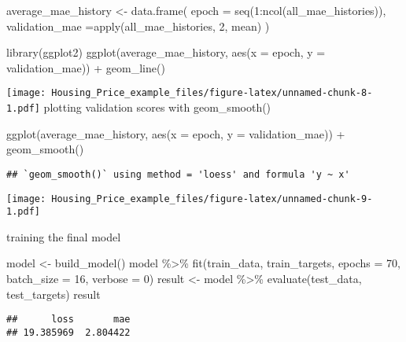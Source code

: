 \documentclass[
]{article}
\newenvironment{Shaded}{\begin{snugshade}}{\end{snugshade}}
\newcommand{\AttributeTok}[1]{\textcolor[rgb]{0.77,0.63,0.00}{#1}}
\newcommand{\DecValTok}[1]{\textcolor[rgb]{0.00,0.00,0.81}{#1}}
\newcommand{\FunctionTok}[1]{\textcolor[rgb]{0.00,0.00,0.00}{#1}}
\newcommand{\NormalTok}[1]{#1}
\newcommand{\OtherTok}[1]{\textcolor[rgb]{0.56,0.35,0.01}{#1}}
\newcommand{\SpecialCharTok}[1]{\textcolor[rgb]{0.00,0.00,0.00}{#1}}
\begin{document}
\begin{Shaded}
\begin{Highlighting}[]
\NormalTok{average\_mae\_history }\OtherTok{\textless{}{-}} \FunctionTok{data.frame}\NormalTok{(}
  \AttributeTok{epoch =} \FunctionTok{seq}\NormalTok{(}\DecValTok{1}\SpecialCharTok{:}\FunctionTok{ncol}\NormalTok{(all\_mae\_histories)), }
  \AttributeTok{validation\_mae =}\FunctionTok{apply}\NormalTok{(all\_mae\_histories, }\DecValTok{2}\NormalTok{, mean)}
\NormalTok{)}

\FunctionTok{library}\NormalTok{(ggplot2)}
\FunctionTok{ggplot}\NormalTok{(average\_mae\_history, }\FunctionTok{aes}\NormalTok{(}\AttributeTok{x =}\NormalTok{ epoch, }\AttributeTok{y =}\NormalTok{ validation\_mae)) }\SpecialCharTok{+} \FunctionTok{geom\_line}\NormalTok{()}
\end{Highlighting}
\end{Shaded}

\texttt{[image: Housing\_Price\_example\_files/figure-latex/unnamed-chunk-8-1.pdf]}
plotting validation scores with geom\_smooth()

\begin{Shaded}
\begin{Highlighting}[]
\FunctionTok{ggplot}\NormalTok{(average\_mae\_history, }\FunctionTok{aes}\NormalTok{(}\AttributeTok{x =}\NormalTok{ epoch, }\AttributeTok{y =}\NormalTok{ validation\_mae)) }\SpecialCharTok{+} \FunctionTok{geom\_smooth}\NormalTok{()}
\end{Highlighting}
\end{Shaded}

\begin{verbatim}
## `geom_smooth()` using method = 'loess' and formula 'y ~ x'
\end{verbatim}

\texttt{[image: Housing\_Price\_example\_files/figure-latex/unnamed-chunk-9-1.pdf]}

training the final model

\begin{Shaded}
\begin{Highlighting}[]
\NormalTok{model }\OtherTok{\textless{}{-}} \FunctionTok{build\_model}\NormalTok{()}
\NormalTok{model }\SpecialCharTok{\%\textgreater{}\%} \FunctionTok{fit}\NormalTok{(train\_data, train\_targets,}
              \AttributeTok{epochs =} \DecValTok{70}\NormalTok{, }\AttributeTok{batch\_size =} \DecValTok{16}\NormalTok{, }\AttributeTok{verbose =} \DecValTok{0}\NormalTok{) }
\NormalTok{result }\OtherTok{\textless{}{-}}\NormalTok{ model }\SpecialCharTok{\%\textgreater{}\%} \FunctionTok{evaluate}\NormalTok{(test\_data, test\_targets)}
\NormalTok{result}
\end{Highlighting}
\end{Shaded}

\begin{verbatim}
##      loss       mae 
## 19.385969  2.804422
\end{verbatim}
\end{document}
